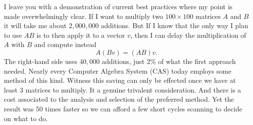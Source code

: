 I leave you with a demonstration of current best practices where my point is 
made overwhelmingly clear.
If I want to multiply two $100\times 100$ matrices $A$ and $B$ it 
will take me about $2,000,000$ additions. But If I know that 
the only way I plan to use $AB$ is to then apply it to a vector $v$,
then I can delay the multiplication of $A$ with $B$ and compute instead
\[
    A(Bv) = (AB)v.
\]
The right-hand side uses $40,000$ additions, just 2\% of what the 
first approach needed.  Nearly every Computer Algebra System (CAS) today 
employs some method of this kind.  
Witness this saving can only be effected once we have at least 3 matrices
to multiply.  It a genuine trivalent consideration.  And there is a cost associated
to the analysis and selection of the preferred method.  Yet the result was 50 times 
faster so we can afford a few short cycles scanning to decide on what to do.



